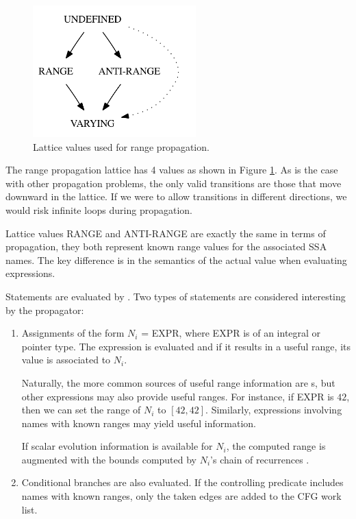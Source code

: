 \begin{figure}
    \centering
    \parbox{2in}{\includegraphics[height=2in]{vrp-4}}
    \caption{Lattice values used for range propagation.}
    \label{novillo:fig:vrp-lattice}
\end{figure}

The range propagation lattice has 4 values as shown in Figure
\ref{novillo:fig:vrp-lattice}.  As is the case with other
propagation problems, the only valid transitions are those that
move downward in the lattice.  If we were to allow transitions in
different directions, we would risk infinite loops during
propagation.

Lattice values \textsc{RANGE} and \textsc{ANTI-RANGE} are exactly
the same in terms of propagation, they both represent known
range values for the associated SSA names.  The key difference is
in the semantics of the actual value when evaluating expressions.

Statements are evaluated by .  Two types of
statements are considered interesting by the propagator:

\begin{enumerate}
\item	Assignments of the form $N_i$ = EXPR, where EXPR is of
	an integral or pointer type.  The expression is evaluated
	and if it results in a useful range, its value is
	associated to $N_i$.
	
	Naturally, the more common sources of useful range
	information are s, but other
	expressions may also provide useful ranges.  For
	instance, if EXPR is $42$, then we can set the range of
	$N_i$ to $[42, 42]$.  Similarly, expressions involving
	names with known ranges may yield useful information.

	If scalar evolution information is available for $N_i$,
	the computed range is augmented with the bounds computed
	by $N_i$'s chain of recurrences
	\cite{novillo:bib:berlin.ea-04}.

\item	Conditional branches are also evaluated.  If the
	controlling predicate includes names with known ranges,
	only the taken edges are added to the CFG work list.
\end{enumerate}

